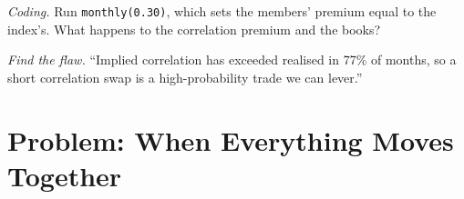 \begin{exercise}[$\star\star\star$]\label{exo:s2:dispersion-and-correlation:7}
\emph{Coding.} Run \texttt{monthly(0.30)}, which sets the members' premium equal to the index's. What happens to the correlation premium and
the books?
\end{exercise}

\begin{exercise}[$\star\star\star$]\label{exo:s2:dispersion-and-correlation:8}
\emph{Find the flaw.} ``Implied correlation has exceeded realised in 77\% of months, so a short correlation swap is a high-probability trade we can
lever.''
\end{exercise}

\section{Problem: When Everything Moves Together}

